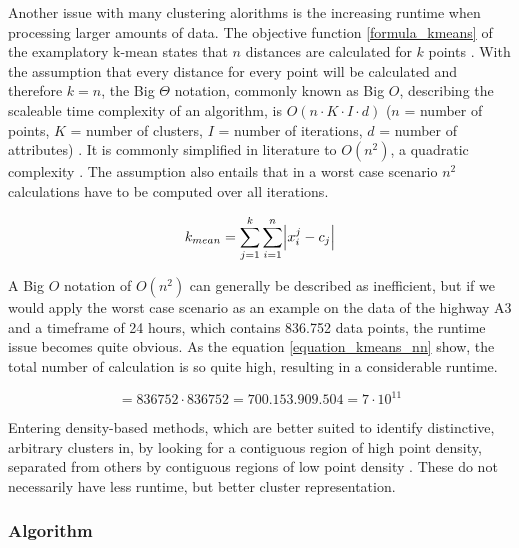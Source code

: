 \documentclass[a4paper,headsepline,footsepline,fontsize=11pt,BCOR=12mm,DIV=12]{report}
\begin{document}
Another issue with many clustering alorithms is the increasing runtime when processing larger amounts of data. The objective function \ref{formula_kmeans} of the examplatory k-mean states that $n$ distances are calculated for $k$ points \cite{Santhanam2010}. With the assumption that every distance for every point will be calculated and therefore $k=n$, the Big $\Theta$ notation, commonly known as Big $O$, describing the scaleable time complexity of an algorithm, is $O(n \cdot K \cdot I \cdot d)$ ($n$ = number of points, $K$ = number of clusters, $I$ = number of iterations, $d$ = number of attributes) \cite{Dalatu2016}. It is commonly simplified in literature to $O(n^2)$, a quadratic complexity \cite{Pakhira2014}. The assumption also entails that in a worst case scenario $n^2$ calculations have to be computed over all iterations.

\begin{equation}
\label{formula_kmeans}
	k_{mean} =  \sum_{j=1}^k{\sum_{i=1}^n{\abs{x_i^j-c_j}}}
\end{equation}

\bigskip

A Big $O$ notation of $O(n^2)$ can generally be described as inefficient, but if we would apply the worst case scenario as an example on the data of the highway A3 and a timeframe of 24 hours, which contains 836.752 data points, the runtime issue becomes quite obvious. As the equation \ref{equation_kmeans_nn} show, the total number of calculation is so quite high, resulting in a considerable runtime. \cite{Busch2004}

\begin{equation}
\label{equation_kmeans_nn}
	 = 836752 \cdot 836752 = 700.153.909.504 = 7 \cdot 10^{11}
\end{equation}

\bigskip

Entering density-based methods, which are better suited to identify distinctive, arbitrary clusters in, by looking for a contiguous region of high point density, separated from others by contiguous regions of low point density \cite{Chauhan2020}. These do not necessarily have less runtime, but better cluster representation.

\subsubsection{Algorithm}
\end{document}
